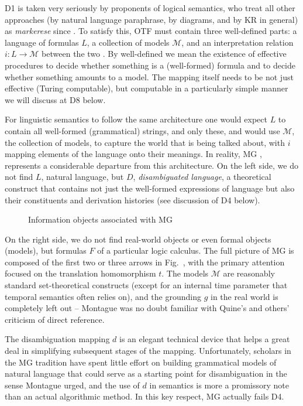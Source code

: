 \documentclass[output=paper,colorlinks=true,citecolor=brown]{langscibook}
\begin{document}
\noindent
D1 is taken very seriously by proponents of logical
semantics, who treat all other approaches (by natural language paraphrase, by
diagrams, and by KR in general) as \emph{markerese} since \citet{Lewis:1970}.
To satisfy this, OTF must contain three well-defined parts: a language of
formulas $L$, a collection of models $\mathcal{M}$, and an interpretation
relation $i: L \rightarrow \mathcal{M} $ between the two \citep{Tarski:1956}.
By well-defined we mean the existence of effective procedures to decide 
whether something is a (well-formed) formula and to decide whether something
amounts to a model. The mapping itself needs to be not just effective (Turing
computable), but computable in a particularly simple manner we will discuss at
D8 below. 

For linguistic semantics to follow the same architecture one would expect $L$
to contain all well-formed (grammatical) strings, and only these, and would
use $\mathcal{M}$, the collection of models, to capture the world that is
being talked about, with $i$ mapping elements of the language onto their
meanings.  In reality, MG \citep{Montague:1970,Montague:1973}, represents a
considerable departure from this architecture. On the left side, we do not
find $L$, natural language, but $D$, \emph{disambiguated language}, a
theoretical construct that contains not just the well-formed expressions of
language but also their constituents and derivation histories (see discussion
of D4 below).

\begin{figure}[h]
\centering
\mbox{}
\caption{Information objects associated with MG}
\label{fig:information_objects}
\end{figure}

On the right side, we do not find real-world objects or even formal objects
(models), but formulas $F$ of a particular logic calculus. The full picture of
MG is composed of the first two or three arrows in
Fig.~, with the primary attention focused on the
translation homomorphism $t$. The models $\mathcal{M}$ are reasonably standard
set-theoretical constructs (except for an internal time parameter that
temporal semantics often relies on), and the grounding $g$ in the real world
is completely left out -- Montague was no doubt familiar with Quine's and
others' criticism of direct reference.

The disambiguation mapping $d$ is an elegant technical device that helps a
great deal in simplifying subsequent stages of the mapping. Unfortunately,
scholars in the MG tradition have spent little effort on building grammatical
models of natural language that could serve as a starting point for
disambiguation in the sense Montague urged, and the use of $d$ in semantics is
more a promissory note than an actual algorithmic method. In this key respect,
MG actually fails D4.
\end{document}
